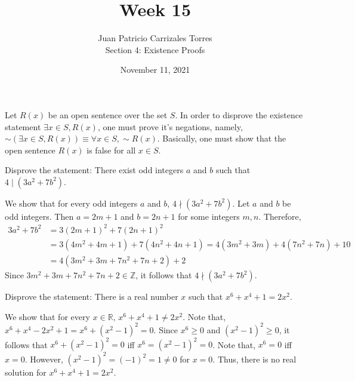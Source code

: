 \documentclass[12pt]{article}
\newcommand{\Z}{\mathbb{Z}}
\newcommand{\R}{\mathbb{R}}
\newenvironment{problem}[2][Problem]{\begin{trivlist}
		\item[\hskip \labelsep {\bfseries #1}\hskip \labelsep {\bfseries #2.}]}{\end{trivlist}}
\newenvironment{solution}[2][Solution]{\begin{trivlist}
		\item[\hskip \labelsep {\bfseries #1}\hskip \labelsep {\bfseries #2.}]}{\end{trivlist}}
\begin{document}
	
	\title{Week 15}
	\author{Juan Patricio Carrizales Torres \\
		Section 4: Existence Proofs}
	\date{November 11, 2021}
	\maketitle

	Let $R(x)$ be an open sentence over the set $S$. In order to disprove the existence statement $\exists x\in S, R(x)$, one must prove it's negations, namely, $\sim (\exists x\in S, R(x)) \equiv \forall x\in S, \sim R(x)$. Basically, one must show that the open sentence $R(x)$ is false for all $x\in S$.
	
	\begin{problem}{49}
		Disprove the statement: There exist odd integers $a$ and $b$ such that $4\mid (3a^{2}+7b^{2})$.
		\begin{solution}{}
			We show that for every odd integers $a$ and $b$, $4\nmid (3a^{2}+7b^{2})$. Let $a$ and $b$ be odd integers. Then $a=2m+1$ and $b=2n+1$ for some integers $m,n$. Therefore,
			\begin{align*}
				3a^{2}+7b^{2} &= 3(2m+1)^{2}+7(2n+1)^{2}\\
				&= 3(4m^{2}+4m+1)+7(4n^{2}+4n+1) =  4(3m^{2}+3m) +  4(7n^{2}+7n) + 10\\
				&= 4(3m^{2}+3m+7n^{2}+7n+2)+2
			\end{align*}
		Since $3m^{2}+3m+7n^{2}+7n+2 \in \Z$, it follows that $4\nmid (3a^{2}+7b^{2})$.
		\end{solution}
	\end{problem}

	\begin{problem}{50}
		Disprove the statement: There is a real number $x$ such that $x^{6}+x^{4}+1=2x^{2}$.
		\begin{solution}{}
			We show that for every $x\in \R$, $x^{6}+x^{4}+1\neq 2x^{2}$. Note that, $x^{6}+x^{4}-2x^{2}+1 = x^{6}+ (x^{2}-1)^{2} = 0$. Since $x^{6}\geq 0$ and $(x^{2}-1)^{2}\geq 0$, it follows that $x^{6}+ (x^{2}-1)^{2} = 0$ iff $x^{6} = (x^{2}-1)^{2} = 0$. Note that, $x^{6}=0$ iff $x=0$. However, $(x^{2}-1)^{2}=(-1)^{2}=1\neq 0$ for $x=0$. Thus, there is no real solution for $x^{6}+x^{4}+1=2x^{2}$.
		\end{solution}
	\end{problem}
 
\end{document}
